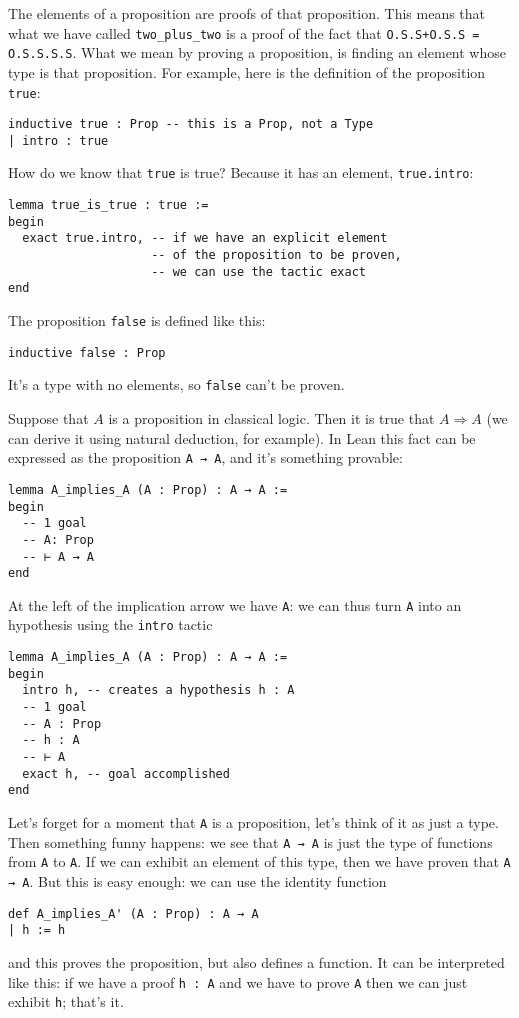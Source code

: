 \documentclass{book}
\theoremstyle{definition}
\theoremstyle{remark}
\theoremstyle{plain}
\begin{document}
The elements of a proposition are proofs of that proposition.
This means that what we have called \lstinline{two_plus_two} is a proof of the fact that \lstinline{O.S.S+O.S.S = O.S.S.S.S}.
What we mean by proving a proposition, is finding an element whose type is that proposition.
For example, here is the definition of the proposition \lstinline{true}:
\begin{lstlisting}
inductive true : Prop -- this is a Prop, not a Type
| intro : true    
\end{lstlisting}
How do we know that \lstinline{true} is true? Because it has an element, \lstinline{true.intro}:
\begin{lstlisting}
lemma true_is_true : true :=
begin
  exact true.intro, -- if we have an explicit element
                    -- of the proposition to be proven,
                    -- we can use the tactic exact
end
\end{lstlisting}
The proposition \lstinline{false} is defined like this:
\begin{lstlisting}
inductive false : Prop  
\end{lstlisting}
It's a type with no elements, so \lstinline{false} can't be proven.

Suppose that $A$ is a proposition in classical logic.
Then it is true that $A \Rightarrow A$ (we can derive it using natural deduction, for example).
In Lean this fact can be expressed as the proposition \lstinline{A → A}, and it's something provable:
\begin{lstlisting}
lemma A_implies_A (A : Prop) : A → A :=
begin
  -- 1 goal
  -- A: Prop
  -- ⊢ A → A
end
\end{lstlisting}
At the left of the implication arrow we have \lstinline{A}:
we can thus turn \lstinline{A} into an hypothesis using the \lstinline{intro} tactic
\begin{lstlisting}
lemma A_implies_A (A : Prop) : A → A :=
begin
  intro h, -- creates a hypothesis h : A
  -- 1 goal
  -- A : Prop
  -- h : A
  -- ⊢ A
  exact h, -- goal accomplished
end
\end{lstlisting}
Let's forget for a moment that \lstinline{A} is a proposition, let's think of it as just a type.
Then something funny happens: we see that \lstinline{A → A} is just the type of functions from \lstinline{A} to \lstinline{A}.
If we can exhibit an element of this type, then we have proven that \lstinline{A → A}.
But this is easy enough: we can use the identity function
\begin{lstlisting}
def A_implies_A' (A : Prop) : A → A
| h := h    
\end{lstlisting}
and this proves the proposition, but also defines a function.
It can be interpreted like this:
if we have a proof \lstinline{h : A} and we have to prove \lstinline{A} then we can just exhibit \lstinline{h}; that's it.
\end{document}
